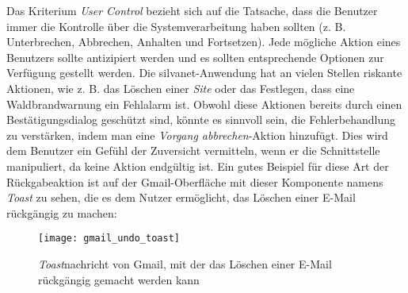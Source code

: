 Das Kriterium \textit{User Control} bezieht sich auf die Tatsache, dass die Benutzer immer die Kontrolle über die Systemverarbeitung haben sollten (z. B. Unterbrechen, Abbrechen, Anhalten und Fortsetzen).
Jede mögliche Aktion eines Benutzers sollte antizipiert werden und es sollten entsprechende Optionen zur Verfügung gestellt werden.
Die silvanet-Anwendung hat an vielen Stellen riskante Aktionen, wie z. B. das Löschen einer \textit{Site} oder das Festlegen, dass eine Waldbrandwarnung ein Fehlalarm ist.
Obwohl diese Aktionen bereits durch einen Bestätigungsdialog geschützt sind, könnte es sinnvoll sein, die Fehlerbehandlung zu verstärken, indem man eine \textit{Vorgang abbrechen}-Aktion hinzufügt.
Dies wird dem Benutzer ein Gefühl der Zuversicht vermitteln, wenn er die Schnittstelle manipuliert, da keine Aktion endgültig ist.
Ein gutes Beispiel für diese Art der Rückgabeaktion ist auf der Gmail-Oberfläche mit dieser Komponente namens \textit{Toast} zu sehen, die es dem Nutzer ermöglicht, das Löschen einer E-Mail rückgängig zu machen:

\begin{figure}[H]
  \centering
  \texttt{[image: gmail\_undo\_toast]}
  \caption{\textit{Toast}nachricht von Gmail, mit der das Löschen einer E-Mail rückgängig gemacht werden kann}
  \label{fig:gmail_undo_toast}
\end{figure}

